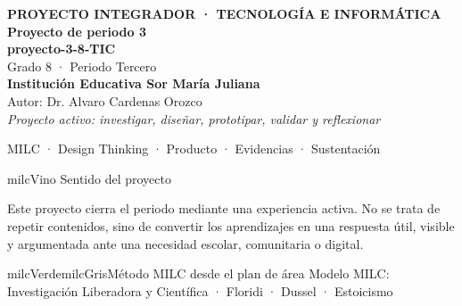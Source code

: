 \documentclass[11pt,letterpaper]{article}
\begin{document}
\thispagestyle{empty}

\vspace*{.85cm}
\begin{tcolorbox}[
  enhanced,colback=milcVino,colframe=milcVino,arc=12mm,width=.86\textwidth,
  boxrule=0pt,left=12mm,right=12mm,top=11mm,bottom=11mm,center,
  overlay={\draw[milcMagenta,line width=2pt,dash pattern=on 9pt off 8pt,rounded corners=10mm]
  ([xshift=7mm,yshift=-7mm]frame.north west) rectangle ([xshift=-7mm,yshift=7mm]frame.south east);}]
  \centering
  {\sffamily\bfseries\color{white}\fontsize{15}{17}\selectfont PROYECTO INTEGRADOR · TECNOLOGÍA E INFORMÁTICA}\\[1.0cm]
  {\sffamily\bfseries\color{white}\fontsize{30}{33}\selectfont Proyecto de periodo 3}\\[3mm]
  {\sffamily\bfseries\color{milcMostaza}\fontsize{25}{28}\selectfont proyecto-3-8-TIC}\\[8mm]
  {\sffamily\color{white}\Large Grado 8 · Periodo Tercero}\\[1.0cm]
  {\sffamily\bfseries\color{white}\large Institución Educativa Sor María Juliana}\\[2mm]
  {\sffamily\color{white}Autor: Dr. Alvaro Cardenas Orozco}\\[4mm]
  {\sffamily\itshape\color{white}Proyecto activo: investigar, diseñar, prototipar, validar y reflexionar}
\end{tcolorbox}
\vfill
\begin{tcolorbox}[enhanced,colback=milcVino!72!black,colframe=milcVino!72!black,arc=5mm,boxrule=0pt,width=.86\textwidth,left=6mm,right=6mm,top=4mm,bottom=4mm,center]
{\color{white}\sffamily\small MILC · Design Thinking · Producto · Evidencias · Sustentación}
\end{tcolorbox}

\newpage
\begin{titlebox}{milcVino}
Sentido del proyecto
\end{titlebox}
\begin{multicols}{2}
Este proyecto cierra el periodo mediante una experiencia activa. No se trata de repetir contenidos, sino de convertir los aprendizajes en una respuesta útil, visible y argumentada ante una necesidad escolar, comunitaria o digital.

\columnbreak
\begin{softbox}{milcVerde}{milcGris}{Método MILC desde el plan de área}
Modelo MILC: Investigación Liberadora y Científica · Floridi · Dussel · Estoicismo
\end{softbox}
\end{multicols}
\end{document}
